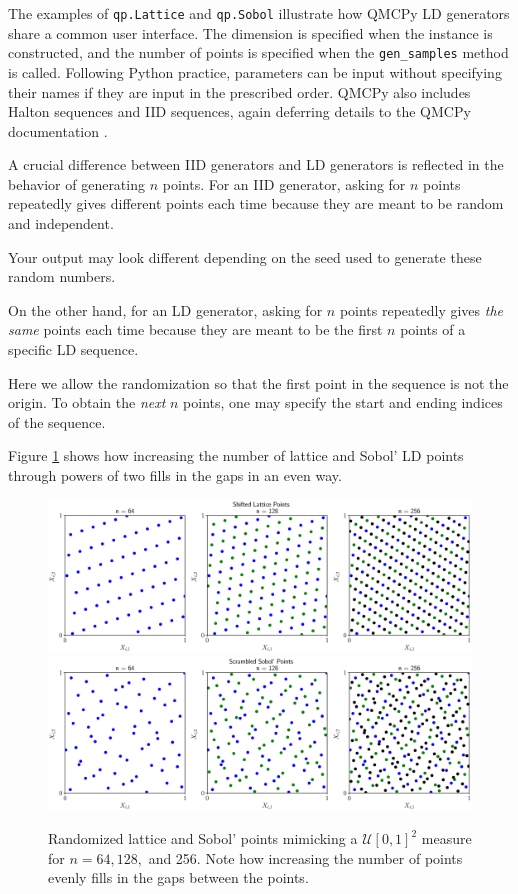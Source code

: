 \documentclass[graybox]{svmult}
\begin{document}
The examples of \texttt{qp.Lattice} and \texttt{qp.Sobol} illustrate how QMCPy LD generators share a common user interface.  The dimension is specified when the instance is constructed, and the number of points is specified when the \texttt{gen\_samples} method is called.  Following Python practice, parameters can be input without specifying their names if they are input in the prescribed order.  QMCPy also includes Halton sequences and IID sequences, again deferring details to the QMCPy documentation \cite{QMCPyDocs}.

A crucial difference between IID generators and LD generators is reflected in the behavior of generating $n$ points.  For an IID generator, asking for $n$ points repeatedly gives different points each time because they are meant to be random and independent.

Your output may look different depending on the seed used to generate these random numbers.

On the other hand, for an LD generator, asking for $n$ points repeatedly gives \emph{the same} points each time because they are meant to be the first $n$ points of a specific LD sequence.  

Here we allow the randomization so that the first point in the sequence is not the origin.  To obtain the \emph{next} $n$ points, one may specify the start and ending indices of the sequence.


Figure \ref{fig:increase_n} shows how increasing the number of lattice and Sobol' LD points through powers of two fills in the gaps in an even way.

\begin{figure}[t]
	\includegraphics[width=1\textwidth]{QMCSoftwareArticle/vfigs/dd_lattice_successive.eps}
	\qquad
	\includegraphics[width=1\textwidth]{QMCSoftwareArticle/vfigs/dd_sobol_successive.eps}
	\caption{Randomized lattice and Sobol' points mimicking a $\mathcal{U}[0,1]^2$ measure for $n = 64, 128,$ and 256. Note how increasing the number of points evenly fills in the gaps between the points.}
	\label{fig:increase_n}
\end{figure}
\end{document}
